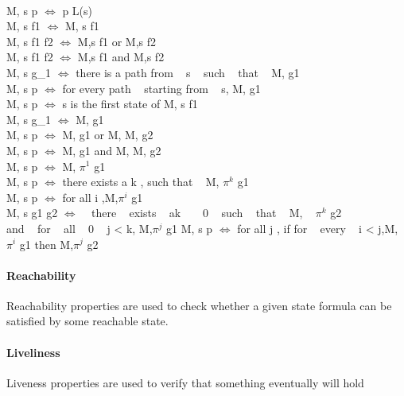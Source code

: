 \newline \\
M, s \models p $\Leftrightarrow$ p \in L(s) \\
M, s \models \not f1 $\Leftrightarrow$ M, s \nvdash f1 \\
M, s \models f1 \vee f2 $\Leftrightarrow$ M,s \models f1 or M,s \nvdash f2 \\
M, s \models f1 \wedge f2 $\Leftrightarrow$  M,s \models f1 and M,s \nvdash f2 \\
M, s \models {} g_{1} $\Leftrightarrow$ there is a path \pi  from ~  s ~   such ~  that  ~ M, \pi \models g1 \\
M, s \models p $\Leftrightarrow$ for every path \pi  ~ starting from  ~  s, M, \pi \models g1 \\
M, s \models p $\Leftrightarrow$ s is the first state of \piand M, s \models f1 \\
M, s \models \not g_{1} $\Leftrightarrow$ M, \pi  \nvdash g1\\
M, s \models p $\Leftrightarrow$  M, \pi  \models g1  or  M, \pi  M, \pi  \models g2\\
M, s \models p $\Leftrightarrow$ M, \pi  \models g1  and  M, \pi  M, \pi  \models g2 \\
M, s \models p $\Leftrightarrow$ M, $\pi^{1}$ \models g1 \\
M, s \models p $\Leftrightarrow$ there exists a k , such that  ~ M, $\pi^{k}$  \models g1\\
M, s \models p $\Leftrightarrow$ for all i ,M,$\pi^{i}$ \models g1 \\
M, s \models g1 \bugcup g2 $\Leftrightarrow$ ~  there  ~ exists  ~ ak  ~ \ge  ~ 0 ~  such ~  that  ~ M,  ~ $\pi^{k}$ \models g2\\
and  ~ for  ~ all ~  0  ~ \le j < k, M,$\pi^{j}$ \models g1
M, s \models p $\Leftrightarrow$ for all j , if for ~  every  ~ i < j,M,$\pi^{i}$ \nvdash g1 then M,$\pi^{j}$ \models g2\\


\paragraph{Reachability}
Reachability properties are used to check whether
a given state formula can be satisfied by some
reachable state.

\paragraph{Liveliness}
Liveness properties are used to verify that
something eventually will hold
